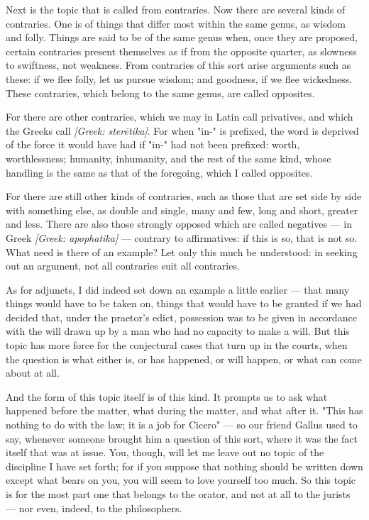  Next is the topic that is called from contraries. Now there are several kinds of contraries. One is of things that differ most within the same genus, as wisdom and folly. Things are said to be of the same genus when, once they are proposed, certain contraries present themselves as if from the opposite quarter, as slowness to swiftness, not weakness. From contraries of this sort arise arguments such as these: if we flee folly, let us pursue wisdom; and goodness, if we flee wickedness. These contraries, which belong to the same genus, are called opposites.

 For there are other contraries, which we may in Latin call privatives, and which the Greeks call \textit{[Greek: sterētika]}. For when "in-" is prefixed, the word is deprived of the force it would have had if "in-" had not been prefixed: worth, worthlessness; humanity, inhumanity, and the rest of the same kind, whose handling is the same as that of the foregoing, which I called opposites.

 For there are still other kinds of contraries, such as those that are set side by side with something else, as double and single, many and few, long and short, greater and less. There are also those strongly opposed which are called negatives — in Greek \textit{[Greek: apophatika]} — contrary to affirmatives: if this is so, that is not so. What need is there of an example? Let only this much be understood: in seeking out an argument, not all contraries suit all contraries.

 As for adjuncts, I did indeed set down an example a little earlier — that many things would have to be taken on, things that would have to be granted if we had decided that, under the praetor's edict, possession was to be given in accordance with the will drawn up by a man who had no capacity to make a will. But this topic has more force for the conjectural cases that turn up in the courts, when the question is what either is, or has happened, or will happen, or what can come about at all.

 And the form of this topic itself is of this kind. It prompts us to ask what happened before the matter, what during the matter, and what after it. "This has nothing to do with the law; it is a job for Cicero" — so our friend Gallus used to say, whenever someone brought him a question of this sort, where it was the fact itself that was at issue. You, though, will let me leave out no topic of the discipline I have set forth; for if you suppose that nothing should be written down except what bears on you, you will seem to love yourself too much. So this topic is for the most part one that belongs to the orator, and not at all to the jurists — nor even, indeed, to the philosophers.


